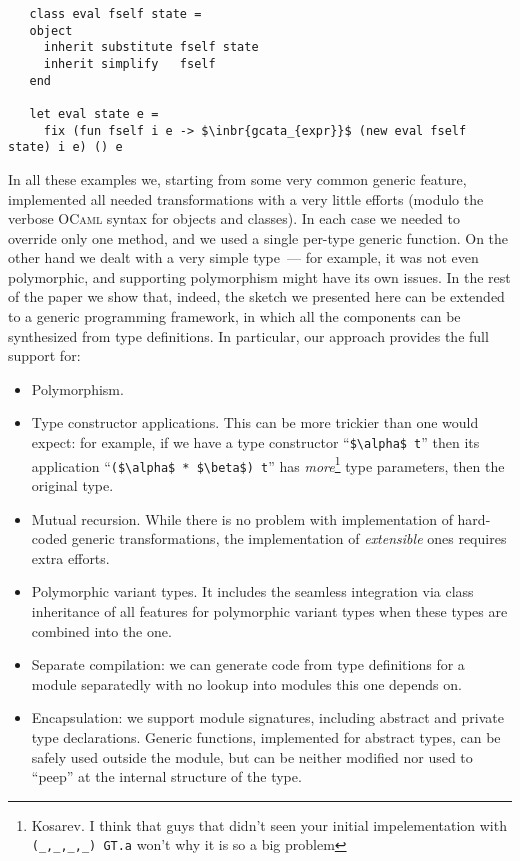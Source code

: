 \begin{lstlisting}
   class eval fself state =
   object
     inherit substitute fself state
     inherit simplify   fself
   end

   let eval state e =
     fix (fun fself i e -> $\inbr{gcata_{expr}}$ (new eval fself state) i e) () e  
\end{lstlisting}

In all these examples we, starting from some very common generic feature, implemented all needed transformations with a very little efforts (modulo
the verbose \textsc{OCaml} syntax for objects and classes). In each case we needed to override only one method, and we used a single per-type generic
function. On the other hand we dealt with a very simple type~--- for example, it was not even polymorphic, and supporting polymorphism might have
its own issues. In the rest of the paper we show that, indeed, the sketch we presented here can be extended to a generic programming
framework, in which all the components can be synthesized from type definitions. In particular, our approach provides the full support for:

\begin{itemize}
\item Polymorphism.
\item Type constructor applications. This can be more trickier than one would expect: for example, if
  we have a type constructor ``\lstinline{$\alpha$ t}'' then its application ``\lstinline{($\alpha$ * $\beta$) t}'' has
  \emph{more}\footnote{Kosarev. I think that guys that didn't seen your initial impelementation with \lstinline=(_,_,_,_) GT.a= won't why it is so a big problem} type parameters, then the original type.
\item Mutual recursion. While there is no problem with implementation of hard-coded generic transformations, the implementation of \emph{extensible} ones
  requires extra efforts.
\item Polymorphic variant types. It includes the seamless integration via class inheritance of all features
  for polymorphic variant types when these types are combined into the one.
\item Separate compilation: we can generate code from type definitions for a module separatedly with no lookup into
  modules this one depends on.
\item Encapsulation: we support module signatures, including abstract and private type declarations. Generic functions, implemented for
  abstract types, can be safely used outside the module, but can be neither modified nor used to ``peep'' at the internal structure of
  the type.  
\end{itemize}

